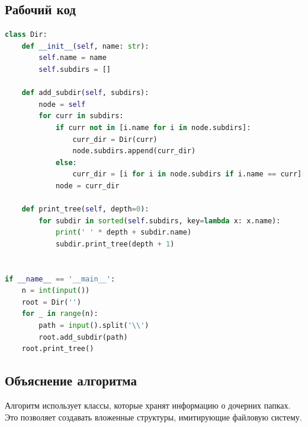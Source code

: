 \documentclass[a4paper,12pt]{article}
\begin{document}
\subsection*{Рабочий код}
\begin{lstlisting}[language=python]
    class Dir:
    def __init__(self, name: str):
        self.name = name
        self.subdirs = []

    def add_subdir(self, subdirs):
        node = self
        for curr in subdirs:
            if curr not in [i.name for i in node.subdirs]:
                curr_dir = Dir(curr)
                node.subdirs.append(curr_dir)
            else:
                curr_dir = [i for i in node.subdirs if i.name == curr][0]
            node = curr_dir

    def print_tree(self, depth=0):
        for subdir in sorted(self.subdirs, key=lambda x: x.name):
            print(' ' * depth + subdir.name)
            subdir.print_tree(depth + 1)
    
    
if __name__ == '__main__':
    n = int(input())
    root = Dir('')
    for _ in range(n):
        path = input().split('\\')
        root.add_subdir(path)
    root.print_tree()
\end{lstlisting}
\subsection*{Объяснение алгоритма}
Алгоритм использует классы, которые хранят информацию о дочерних папках. Это позволяет создавать вложенные структуры, имитирующие файловую систему.

\newpage
\end{document}
